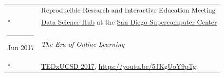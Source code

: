 \documentclass[margin,line]{res}
\begin{document}
\begin{resume}
\begin{longtable}{@{}p{0.7in}p{4in}}
\hspace*{-4mm} & \hspace{4mm} Reproducible Research and Interactive Education Meeting\\*
\hspace*{-4mm} & \hspace{4mm} \href{https://datascience.sdsc.edu/}{Data Science Hub} at the \href{https://www.sdsc.edu/}{San Diego Supercomputer Center}\\
\hspace*{-4mm} \rule{-1mm}{5mm} Jun 2017 & \textit{The Era of Online Learning}\\*
\hspace*{-4mm} & \hspace{4mm} \href{https://www.ted.com/tedx/events/22004}{TEDxUCSD 2017}, \href{https://youtu.be/5JKgUoY9pTg}{https://youtu.be/5JKgUoY9pTg}\\
\end{longtable}


\end{resume}
\end{document}
